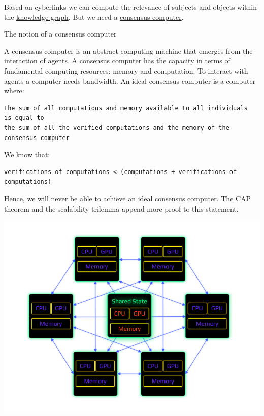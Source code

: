 \documentclass[8pt,oneside]{amsart}
\makeatletter
\renewcommand\subsection{\@startsection{subsection}
                                    {2}{\z@}
                                    {-3.25ex\@plus -1ex \@minus -.2ex}
                                    {0ex \@plus .2ex}
                                    {\play\Large}
                        }
\newcommand{\titleSection}[1]{\subsection{#1}}
\newenvironment{Figure}
  {\par\medskip\noindent\minipage{\linewidth}}
  {\endminipage\par\medskip}
\makeatother
\begin{document}
Based on cyberlinks we can compute the relevance of subjects and objects within the {\hyperref[knowledge-graph]{knowledge graph}}. But we need a {\hyperref[consensus-computer]{consensus computer}}.

\titleSection{The notion of a consensus computer}\label{consensus-computer}

A consensus computer is an abstract computing machine that emerges from the interaction of agents. A consensus computer has the capacity in terms of fundamental computing resources: memory and computation. To interact with agents a computer needs bandwidth. An ideal consensus computer is a computer where:
\\
\begin{lstlisting}
the sum of all computations and memory available to all individuals
is equal to
the sum of all the verified computations and the memory of the consensus computer
\end{lstlisting}

We know that:
\begin{lstlisting}
verifications of computations < (computations + verifications of computations)
\end{lstlisting}

Hence, we will never be able to achieve an ideal consensus computer. The CAP theorem and the scalability trilemma append more proof to this statement.
\begin{Figure}
    \centering
    \includegraphics[width=1\textwidth]{consensus-computer.png}
\end{Figure}
\end{document}
